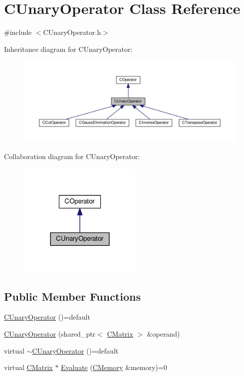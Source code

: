 \hypertarget{classCUnaryOperator}{}\section{C\+Unary\+Operator Class Reference}
\label{classCUnaryOperator}


{\ttfamily \#include $<$C\+Unary\+Operator.\+h$>$}



Inheritance diagram for C\+Unary\+Operator\+:\nopagebreak
\begin{figure}[H]
\begin{center}
\leavevmode
\includegraphics[width=350pt]{classCUnaryOperator__inherit__graph}
\end{center}
\end{figure}


Collaboration diagram for C\+Unary\+Operator\+:\nopagebreak
\begin{figure}[H]
\begin{center}
\leavevmode
\includegraphics[width=168pt]{classCUnaryOperator__coll__graph}
\end{center}
\end{figure}
\subsection*{Public Member Functions}
\begin{DoxyCompactItemize}
\item 
\hyperlink{classCUnaryOperator_adffd1d4c0bf2cd8f53be92366c5fd520}{C\+Unary\+Operator} ()=default
\item 
\hyperlink{classCUnaryOperator_a2472f6fb06919bbc7c5e460a337cf9d3}{C\+Unary\+Operator} (shared\+\_\+ptr$<$ \hyperlink{classCMatrix}{C\+Matrix} $>$ \&operand)
\item 
virtual \hyperlink{classCUnaryOperator_ae12e63cdb2573b8b6d0470879478f326}{$\sim$\+C\+Unary\+Operator} ()=default
\item 
virtual \hyperlink{classCMatrix}{C\+Matrix} $\ast$ \hyperlink{classCUnaryOperator_a17b01d9de023a58642f6fd82f214cde0}{Evaluate} (\hyperlink{classCMemory}{C\+Memory} \&memory)=0
\end{DoxyCompactItemize}
